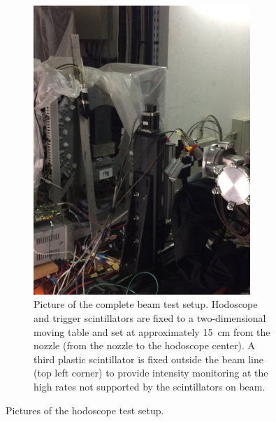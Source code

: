 \begin{figure}[!htbp]
\begin{subfigure}[t]{.5\textwidth}
\includegraphics[width=0.9\textwidth]{03_GraphicFiles/chapter6_BeamTests/Nice_May2018/IMG_5186.jpg}	
\caption{Picture of the complete beam test setup. Hodoscope and trigger scintillators are fixed to a two-dimensional moving table and set at approximately 15~cm from the nozzle (from the nozzle to the hodoscope center). A third plastic scintillator is fixed outside the beam line (top left corner) to provide intensity monitoring at the high rates not supported by the scintillators on beam.}
\label{chap6::fig::May_HodoSetupPicture}
\end{subfigure}
\caption{Pictures of the hodoscope test setup.}
\label{chap6::fig::May_HodoSetup}
\end{figure}

